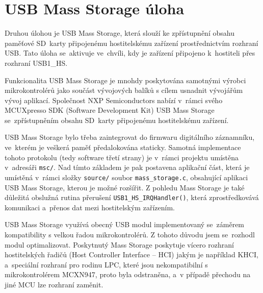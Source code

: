 
\section{USB Mass Storage úloha}
Druhou úlohou je USB Mass Storage, která slouží ke zpřístupnění obsahu paměťové SD~karty připojenému hostitelskému zařízení prostřednictvím rozhraní USB. Tato úloha se~aktivuje ve~chvíli, kdy je zařízení připojeno k~hostiteli přes rozhraní USB1\_HS.


Funkcionalita USB Mass Storage je mnohdy poskytována samotnými výrobci mikrokontrolérů jako součást vývojových balíků s cílem usnadnit vývojářům vývoj aplikací. Společnost NXP Semiconductors nabízí v~rámci svého MCUXpresso SDK (Software Development Kit) USB Mass Storage se~zpřístupněním obsahu SD~karty připojenému hostitelskému zařízení.

USB Mass Storage bylo třeba zaintegrovat do firmwaru digitálního záznamníku, ve~kterém je veškerá paměť předalokována staticky. Samotná implementace tohoto protokolu (tedy software třetí strany) je v~rámci projektu umístěna v~adresáři \texttt{msc/}. Nad tímto základem je pak postavena aplikační část, která je umístěná v~rámci složky \texttt{source/} soubor \texttt{mass\_storage.c}, obsahující aplikaci USB Mass Storage, kterou je možné rozšířit. Z pohledu Mass Storage je také důležitá obslužná rutina přerušení \texttt{USB1\_HS\_IRQHandler()}, která zprostředkovává komunikaci a~přenos dat mezi hostitelským zařízením.

USB Mass Storage využívá obecný USB modul implementovaný se~záměrem kompatibility s velkou řadou mikrokontrolérů. Z tohoto důvodu jsem se~rozhodl modul optimalizovat. Poskytnutý Mass Storage poskytuje vícero rozhraní hostitelských řadičů (Host Controller Interface -- HCI) jakým je například KHCI, a~speciální rozhraní pro rodinu LPC, které jsou nekompatibilní s mikrokontrolérem MCXN947, proto byla odstraněna, a~v případě přechodu na jiné MCU lze rozhraní zaměnit. 



